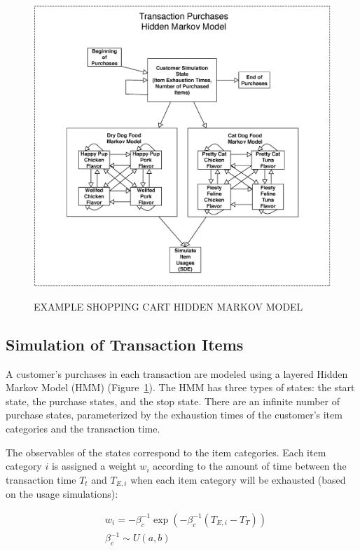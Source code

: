 \begin{figure}[!t]
  \centering
  \caption{\uppercase{Example Shopping Cart Hidden Markov Model}}
  \includegraphics[width=6in]{figures/bigpetstore/shopping_cart_simulation.eps}
  \label{fig:shopping_cart_sim}
\end{figure}

\subsection{Simulation of Transaction Items} \label{sec:transaction-purchases}

A customer's purchases in each transaction are modeled using a layered Hidden Markov Model (HMM) (Figure~\ref{fig:shopping_cart_sim}).  The HMM has three types of states: the start state, the purchase states, and the stop state. There are an infinite number of purchase states, parameterized by the exhaustion times of the customer's item categories and the transaction time.

The observables of the states correspond to the item categories.  Each item category $i$ is assigned a weight $w_i$ according to the amount of time between the transaction time $T_t$ and $T_{E,i}$ when each item category will be exhausted (based on the usage simulations):

\begin{align} \label{eq:category-weights}
&w_i = - \beta^{-1}_c \exp(-\beta^{-1}_c (T_{E, i}- T_T)) \\
&\beta^{-1}_c \sim U(a,b) \nonumber
\end{align}

